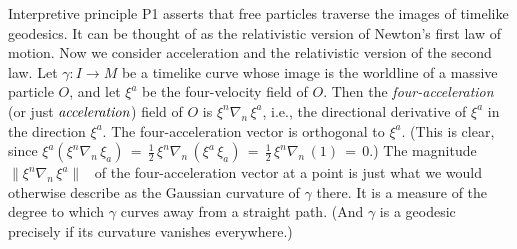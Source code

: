 \documentclass [12] {article}
\theoremstyle{plain}
\numberwithin{figure}{subsection}
\numberwithin{proposition}{subsection}
\begin{document}
Interpretive principle P1 asserts that free particles traverse the images of timelike geodesics. It can be thought of as the relativistic version of Newton's first law of motion. Now we consider acceleration and the relativistic version  of the second law.   Let $\gamma : I \rightarrow M$ be a  timelike curve whose image is the worldline of a massive particle $O$,  and let $\xi^a$ be the four-velocity field of $O$. Then the \emph{four-acceleration} (or just $\emph{acceleration}$) field of $O$ is $\xi^n  \nabla_n \, \xi^a$, i.e.,  the directional derivative of $\xi^a$ in the direction $\xi^a$. The four-acceleration vector is orthogonal to $\xi^a$. (This is clear, since $\xi^a (\xi^n  \nabla_n \, \xi_a)  \, = \, \frac{1}{2} \, \xi^n  \nabla_n \, (\xi^a \, \xi_a)  \, = \, \frac{1}{2} \, \xi^n  \nabla_n \, ( 1)  \, = \,  0.$)  The magnitude \ $\|\xi^n  \nabla_n \, \xi^a \|$ \  of the four-acceleration vector at a point   is just what we would otherwise describe as the Gaussian curvature of $\gamma$ there.   It is a measure of the degree to which $\gamma$ curves away from a straight  path.  (And $\gamma$ is a geodesic precisely if its curvature vanishes everywhere.) 
%
%
\end{document}
